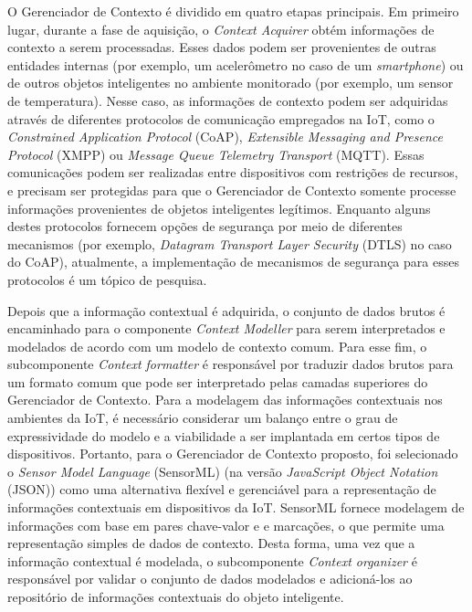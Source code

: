 \documentclass[tid,table]{texufpel} %
\begin{document}
O Gerenciador de Contexto é dividido em quatro etapas principais. Em primeiro lugar, durante a fase de aquisição, o \textit{Context Acquirer} obtém informações de contexto a serem processadas. Esses dados podem ser provenientes de outras entidades internas (por exemplo, um acelerômetro no caso de um \textit{smartphone}) ou de outros objetos inteligentes no ambiente monitorado (por exemplo, um sensor de temperatura). Nesse caso, as informações de contexto podem ser adquiridas através de diferentes protocolos de comunicação empregados na IoT, como o \textit{Constrained Application Protocol} (CoAP), \textit{Extensible Messaging and Presence Protocol} (XMPP) ou \textit{Message Queue Telemetry Transport} (MQTT). Essas comunicações podem ser realizadas entre dispositivos com restrições de recursos, e precisam ser protegidas para que o Gerenciador de Contexto somente processe informações provenientes de objetos inteligentes legítimos. Enquanto alguns destes protocolos fornecem opções de segurança por meio de diferentes mecanismos (por exemplo, \textit{Datagram Transport Layer Security} (DTLS) no caso do CoAP), atualmente, a implementação de mecanismos de segurança para esses protocolos é um tópico de pesquisa. 
 
Depois que a informação contextual é adquirida, o conjunto de dados brutos é encaminhado para o componente \textit{Context Modeller} para serem interpretados e modelados de acordo com um modelo de contexto comum. Para esse fim, o subcomponente  \textit{Context formatter} é responsável por traduzir dados brutos para um formato comum que pode ser interpretado pelas camadas superiores do Gerenciador de Contexto. Para a modelagem das informações contextuais nos ambientes da IoT, é necessário considerar um balanço entre o grau de expressividade do modelo e a viabilidade a ser implantada em certos tipos de dispositivos. Portanto, para o Gerenciador de Contexto proposto, foi selecionado o \textit{Sensor Model Language} (SensorML) \cite{ocg18} (na versão \textit{JavaScript Object Notation} (JSON)) como uma alternativa flexível e gerenciável para a representação de informações contextuais em dispositivos da IoT. SensorML fornece modelagem de informações com base em pares chave-valor e e marcações, o que permite uma representação simples de dados de contexto. Desta forma, uma vez que a informação contextual é modelada, o subcomponente \textit{Context organizer} é responsável por validar o conjunto de dados modelados e adicioná-los ao repositório de informações contextuais do objeto inteligente.
\end{document}
